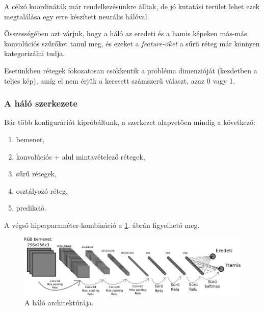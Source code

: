 A célzó koordináták már rendelkezésünkre álltak, de jó kutatási terület lehet ezek 
megtalálása egy erre készített neurális hálóval.


Összességében azt várjuk, hogy a háló az eredeti és a hamis képeken más-más 
konvolúciós szűrőket tanul meg, és ezeket
a \textit{feature-öket} a sűrű réteg már könnyen kategorizálni tudja.

Esetünkben rétegek fokozatosan csökkentik a probléma
dimenzióját (kezdetben a teljes kép), amíg el nem érjük a keresett számszerű választ, azaz 0 vagy 1.

\subsubsection{A háló szerkezete}

Bár több konfigurációt kipróbáltunk, a szerkezet alapvetően mindig a következő:



\begin{enumerate} [itemsep=-1ex]
	\item bemenet,
	\item konvolúciós + alul mintavételező rétegek,
	\item sűrű rétegek,
	\item osztályozó réteg,
	\item predikció.
\end{enumerate}


A végső hiperparaméter-kombináció a \ref{fig:predictor-halo-modell}. ábrán figyelhető meg.

\begin{figure} [h!]

	\centering
	\includegraphics[scale=0.3]{img/predictor-network-modell.pdf}
	\caption{A háló architektúrája.}
	\label{fig:predictor-halo-modell}
\end{figure}

